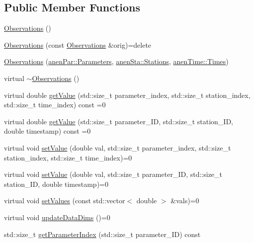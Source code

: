 \subsection*{Public Member Functions}
\begin{DoxyCompactItemize}
\item 
\mbox{\hyperlink{class_observations_a80e66bee67e5e5eb41aa60b6d6f71544}{Observations}} ()
\item 
\mbox{\hyperlink{class_observations_a579feccdac9c26226cf813ac8cf3521a}{Observations}} (const \mbox{\hyperlink{class_observations}{Observations}} \&orig)=delete
\item 
\mbox{\hyperlink{class_observations_acd73489a964b9794e0a265ce394d6f17}{Observations}} (\mbox{\hyperlink{classanen_par_1_1_parameters}{anen\+Par\+::\+Parameters}}, \mbox{\hyperlink{classanen_sta_1_1_stations}{anen\+Sta\+::\+Stations}}, \mbox{\hyperlink{classanen_time_1_1_times}{anen\+Time\+::\+Times}})
\item 
virtual \mbox{\hyperlink{class_observations_a8724b267cce796b0f77f8f2b9e4aaf1d}{$\sim$\+Observations}} ()
\item 
virtual double \mbox{\hyperlink{class_observations_ad7b52b880869698f4d191f47bae766e2}{get\+Value}} (std\+::size\+\_\+t parameter\+\_\+index, std\+::size\+\_\+t station\+\_\+index, std\+::size\+\_\+t time\+\_\+index) const =0
\item 
virtual double \mbox{\hyperlink{class_observations_ac5564bbf13e79d269407d1ecf567cd7f}{get\+Value}} (std\+::size\+\_\+t parameter\+\_\+\+ID, std\+::size\+\_\+t station\+\_\+\+ID, double timestamp) const =0
\item 
virtual void \mbox{\hyperlink{class_observations_a6f00b4a2277ce9e77cd0d5975f4066f8}{set\+Value}} (double val, std\+::size\+\_\+t parameter\+\_\+index, std\+::size\+\_\+t station\+\_\+index, std\+::size\+\_\+t time\+\_\+index)=0
\item 
virtual void \mbox{\hyperlink{class_observations_a6ec8166ad0f141e23a07847ab3646a61}{set\+Value}} (double val, std\+::size\+\_\+t parameter\+\_\+\+ID, std\+::size\+\_\+t station\+\_\+\+ID, double timestamp)=0
\item 
virtual void \mbox{\hyperlink{class_observations_a3aaf49cad714ff61c105d26b4b083ac3}{set\+Values}} (const std\+::vector$<$ double $>$ \&vals)=0
\item 
virtual void \mbox{\hyperlink{class_observations_aab0540879c2d3fdf5f91d30ea2f902fd}{update\+Data\+Dims}} ()=0
\item 
std\+::size\+\_\+t \mbox{\hyperlink{class_observations_a73897578d7e1d4aaf6023857db896ee8}{get\+Parameter\+Index}} (std\+::size\+\_\+t parameter\+\_\+\+ID) const

\end{DoxyCompactItemize}
